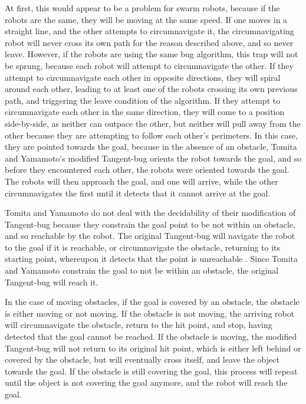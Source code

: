 At first, this would appear to be a problem for swarm robots, because if the robots are the same, they will be moving at the same speed. 
If one moves in a straight line, and the other attempts to circumnavigate it, the circumnavigating robot will never cross its own path for the reason described above, and so never leave. 
However, if the robots are using the same bug algorithm, this trap will not be sprung, because each robot will attempt to circumnavigate the other. 
If they attempt to circumnavigate each other in opposite directions, they will spiral around each other, leading to at least one of the robots crossing its own previous path, and triggering the leave condition of the algorithm. 
If they attempt to circumnavigate each other in the same direction, they will come to a position side-by-side, as neither can outpace the other, but neither will pull away from the other because they are attempting to follow each other's perimeters. 
In this case, they are pointed towards the goal, because in the absence of an obstacle, Tomita and Yamamoto's modified Tangent-bug orients the robot towards the goal, and so before they encountered each other, the robots were oriented towards the goal.
The robots will then approach the goal, and one will arrive, while the other circumnavigates the first until it detects that it cannot arrive at the goal. 

Tomita and Yamamoto do not deal with the decidability of their modification of Tangent-bug because they constrain the goal point to be not within an obstacle, and so reachable by the robot. The original Tangent-bug will navigate the robot to the goal if it is reachable, or circumnavigate the obstacle, returning to its starting point, whereupon it detects that the point is unreachable \citep{kamon1998tangentbug}. Since Tomita and Yamamoto constrain the goal to not be within an obstacle, the original Tangent-bug will reach it. 

In the case of moving obstacles, if the goal is covered by an obstacle, the obstacle is either moving or not moving. 
If the obstacle is not moving, the arriving robot will circumnavigate the obstacle, return to the hit point, and stop, having detected that the goal cannot be reached.
If the obstacle is moving, the modified Tangent-bug will not return to its original hit point, which is either left behind or covered by the obstacle, but will eventually cross itself, and leave the object towards the goal.
If the obstacle is still covering the goal, this process will repeat until the object is not covering the goal anymore, and the robot will reach the goal. 

